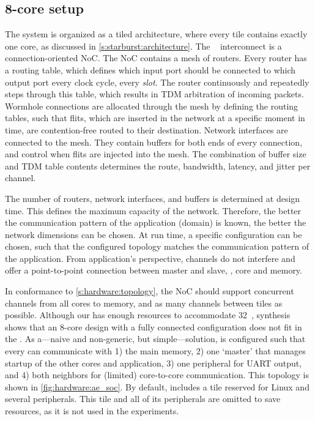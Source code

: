 \subsection{8-core setup}
\label{s:hardware:ae:setup}

The system is organized as a tiled architecture, where every tile contains exactly one core, as discussed in \cref{s:starburst:architecture}.
The \aethereal*~\cite{goossens:aethereal} interconnect is a connection-oriented \ac{NoC}.
The \ac{NoC} contains a mesh of routers.
Every router has a routing table, which defines which input port should be connected to which output port every clock cycle, \ie every \emph{slot}.
The router continuously and repeatedly steps through this table, which results in \ac{TDM} arbitration of incoming packets.
Wormhole connections are allocated through the mesh by defining the routing tables, such that \acp{flit}, which are inserted in the network at a specific moment in time, are contention-free routed to their destination.
Network interfaces are connected to the mesh.
They contain buffers for both ends of every connection, and control when \acp{flit} are injected into the mesh.
The combination of buffer size and \ac{TDM} table contents determines the route, bandwidth, latency, and jitter per channel.

The number of routers, network interfaces, and buffers is determined at design time.
This defines the maximum capacity of the network.
Therefore, the better the communication pattern of the application (domain) is known, the better the network dimensions can be chosen.
At run time, a specific configuration can be chosen, such that the configured topology matches the communication pattern of the application.
From application's perspective, channels do not interfere and offer a point-to-point connection between master and slave, \eg, core and memory.

In conformance to \cref{s:hardware:topology}, the \ac{NoC} should support concurrent channels from all cores to memory, and as many channels between tiles as possible.
Although our \ourVirtex has enough resources to accommodate 32~\MicroBlazes*, synthesis shows that an 8-core design with a fully connected \aethereal configuration does not fit in the .
As a---naive and non-generic, but simple---solution, \aethereal is configured such that every \MicroBlaze can communicate with 
	1) the main memory,
	2) one `master' \MicroBlaze that manages startup of the other cores and application, 
	3) one peripheral for \ac{UART} output, and 
	4) both neighbors for (limited) core-to-core communication.
This topology is shown in \vref{fig:hardware:ae_soc}.
By default, \Starburst includes a tile reserved for Linux and several peripherals.
This tile and all of its peripherals are omitted to save resources, as it is not used in the experiments.

